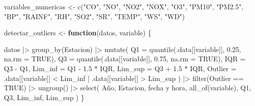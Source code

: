 \documentclass[
  letterpaper,
  DIV=11,
  numbers=noendperiod]{scrartcl}
\newenvironment{Shaded}{\begin{snugshade}}{\end{snugshade}}
\newcommand{\AttributeTok}[1]{\textcolor[rgb]{0.40,0.45,0.13}{#1}}
\newcommand{\ConstantTok}[1]{\textcolor[rgb]{0.56,0.35,0.01}{#1}}
\newcommand{\ControlFlowTok}[1]{\textcolor[rgb]{0.00,0.23,0.31}{\textbf{#1}}}
\newcommand{\FloatTok}[1]{\textcolor[rgb]{0.68,0.00,0.00}{#1}}
\newcommand{\FunctionTok}[1]{\textcolor[rgb]{0.28,0.35,0.67}{#1}}
\newcommand{\NormalTok}[1]{\textcolor[rgb]{0.00,0.23,0.31}{#1}}
\newcommand{\OtherTok}[1]{\textcolor[rgb]{0.00,0.23,0.31}{#1}}
\newcommand{\SpecialCharTok}[1]{\textcolor[rgb]{0.37,0.37,0.37}{#1}}
\newcommand{\StringTok}[1]{\textcolor[rgb]{0.13,0.47,0.30}{#1}}
\begin{document}
\begin{Shaded}
\begin{Highlighting}[]
\NormalTok{variables\_numericas }\OtherTok{\textless{}{-}} \FunctionTok{c}\NormalTok{(}\StringTok{"CO"}\NormalTok{, }\StringTok{"NO"}\NormalTok{, }\StringTok{"NO2"}\NormalTok{, }\StringTok{"NOX"}\NormalTok{, }\StringTok{"O3"}\NormalTok{, }\StringTok{"PM10"}\NormalTok{, }\StringTok{"PM2.5"}\NormalTok{, }\StringTok{"BP"}\NormalTok{, }\StringTok{"RAINF"}\NormalTok{, }\StringTok{"RH"}\NormalTok{, }\StringTok{"SO2"}\NormalTok{, }\StringTok{"SR"}\NormalTok{, }\StringTok{"TEMP"}\NormalTok{, }\StringTok{"WS"}\NormalTok{, }\StringTok{"WD"}\NormalTok{)}

\NormalTok{detectar\_outliers }\OtherTok{\textless{}{-}} \ControlFlowTok{function}\NormalTok{(datos, variable) \{}
  
\NormalTok{  datos }\SpecialCharTok{|\textgreater{}}
    \FunctionTok{group\_by}\NormalTok{(Estacion) }\SpecialCharTok{|\textgreater{}}
    \FunctionTok{mutate}\NormalTok{(}
      \AttributeTok{Q1 =} \FunctionTok{quantile}\NormalTok{(.data[[variable]], }\FloatTok{0.25}\NormalTok{, }\AttributeTok{na.rm =} \ConstantTok{TRUE}\NormalTok{),}
      \AttributeTok{Q3 =} \FunctionTok{quantile}\NormalTok{(.data[[variable]], }\FloatTok{0.75}\NormalTok{, }\AttributeTok{na.rm =} \ConstantTok{TRUE}\NormalTok{),}
      \AttributeTok{IQR =}\NormalTok{ Q3 }\SpecialCharTok{{-}}\NormalTok{ Q1,}
      \AttributeTok{Lim\_inf =}\NormalTok{ Q1 }\SpecialCharTok{{-}} \FloatTok{1.5} \SpecialCharTok{*}\NormalTok{ IQR,}
      \AttributeTok{Lim\_sup =}\NormalTok{ Q3 }\SpecialCharTok{+} \FloatTok{1.5} \SpecialCharTok{*}\NormalTok{ IQR,}
      \AttributeTok{Outlier =}\NormalTok{ .data[[variable]] }\SpecialCharTok{\textless{}}\NormalTok{ Lim\_inf }\SpecialCharTok{|}
\NormalTok{                .data[[variable]] }\SpecialCharTok{\textgreater{}}\NormalTok{ Lim\_sup}
\NormalTok{    ) }\SpecialCharTok{|\textgreater{}}
    \FunctionTok{filter}\NormalTok{(Outlier }\SpecialCharTok{==} \ConstantTok{TRUE}\NormalTok{) }\SpecialCharTok{|\textgreater{}}
    \FunctionTok{ungroup}\NormalTok{() }\SpecialCharTok{|\textgreater{}}
    \FunctionTok{select}\NormalTok{(}
\NormalTok{      Año,}
\NormalTok{      Estacion,}
      \StringTok{\textasciigrave{}}\AttributeTok{fecha y hora}\StringTok{\textasciigrave{}}\NormalTok{,}
      \FunctionTok{all\_of}\NormalTok{(variable),}
\NormalTok{      Q1,}
\NormalTok{      Q3,}
\NormalTok{      Lim\_inf,}
\NormalTok{      Lim\_sup}
\NormalTok{    )}
\NormalTok{\}}




\end{Highlighting}
\end{Shaded}
\end{document}
